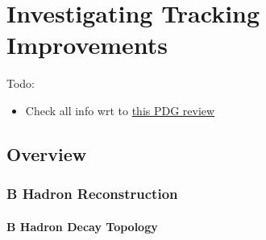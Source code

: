 \chapter{ Investigating Tracking Improvements}
\label{chap:tracking}

Todo:
\begin{itemize}
    \item Check all info wrt to  \href{https://pdg.lbl.gov/2018/reviews/rpp2018-rev-b-meson-prod-decay.pdf}{this PDG review}
\end{itemize}


\section{Overview}\label{sec:tracking overview}

\subsection{B Hadron Reconstruction}\label{sec:b reconstruction}

\subsubsection{B Hadron Decay Topology}\label{sec:b decay topolgy}


